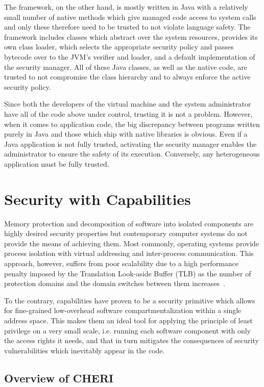 \documentclass[a4paper,12pt,twoside,openright]{report}
\begin{document}
The framework, on the other hand, is mostly written in Java with a relatively small number of native methods which give managed code access to system calls and only these therefore need to be trusted to not violate language safety. The framework includes classes which abstract over the system resources, provides its own class loader, which selects the appropriate security policy and passes bytecode over to the JVM's verifier and loader, and a default implementation of the security manager. All of these Java classes, as well as the native code, are trusted to not compromise the class hierarchy and to always enforce the active security policy.

Since both the developers of the virtual machine and the system administrator have all of the code above under control, trusting it is not a problem. However, when it comes to application code, the big discrepancy between programs written purely in Java and those which ship with native libraries is obvious. Even if a Java application is not fully trusted, activating the security manager enables the administrator to ensure the safety of its execution. Conversely, any heterogeneous application must be fully trusted.

\section{Security with Capabilities}

Memory protection and decomposition of software into isolated components are highly desired security properties but contemporary computer systems do not provide the means of achieving them. Most commonly, operating systems provide process isolation with virtual addressing and inter-process communication. This approach, however, suffers from poor scalability due to a high performance penalty imposed by the Translation Look-aside Buffer (TLB) as the number of protection domains and the domain switches between them increases~\cite{watson2012cheri}.

To the contrary, capabilities have proven to be a security primitive which allows for fine-grained low-overhead software compartmentalization within a single address space. This makes them an ideal tool for applying the principle of least privilege on a very small scale, i.e. running each software component with only the access rights it needs, and that in turn mitigates the consequences of security vulnerabilities which inevitably appear in the code. 

\subsection{Overview of CHERI}
\end{document}
